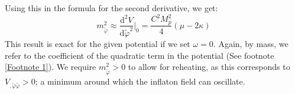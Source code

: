 \documentclass[aps,prd,reprint,preprintnumbers,showpacs,floatfix,nofootinbib,superscript address]{revtex4-2}
\begin{document}
Using this in the formula for the second derivative, we get:
\begin{equation}
    m_{\tilde{\varphi}}^2 \approx  \frac{\text{d}^2V}{\text{d}\tilde{\varphi}^2} \Bigg|_0 = \frac{C^2M_p^2}{4}(  \mu - 2\kappa)
\end{equation}
This result is exact for the given potential if we set $\omega = 0$. Again, by mass, we refer to the coefficient of the quadratic term in the potential (See footnote \ref{Footnote 1}). We require $m_{\tilde{\varphi}}^2 > 0$ to allow for reheating, as this corresponds to $V_{,\tilde{\varphi}\tilde{\varphi}} > 0$; a minimum around which the inflaton field can oscillate.

\end{document}
